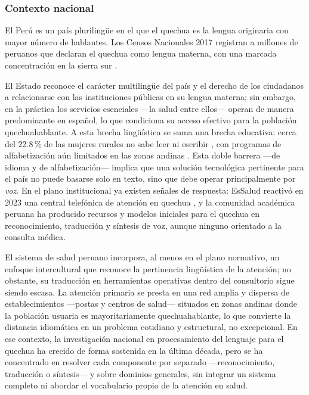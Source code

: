 \documentclass[12pt,a4paper]{article}
\newcommand{\obsdos}[1]{\textcolor{verdeOK}{#1}}
\newenvironment{bloqueObsDos}{\par\color{verdeOK}}{\par}
\begin{document}
\subsubsection{\obsdos{Contexto nacional}}
El Per{\'u} es un pa{\'i}s plurilingüe en el que el quechua es la lengua originaria con mayor
n{\'u}mero de hablantes. Los Censos Nacionales 2017 registran a millones de peruanos que declaran
el quechua como lengua materna, con una marcada concentraci{\'o}n en la sierra sur
\parencite{inei2017}.
\begin{bloqueObsDos}
\noindent El Estado reconoce el car{\'a}cter multiling{\"u}e del pa{\'i}s y el derecho de los
ciudadanos a relacionarse con las instituciones p{\'u}blicas en su lengua materna; sin embargo, en
la pr{\'a}ctica los servicios esenciales ---la salud entre ellos--- operan de manera predominante en
espa{\~n}ol, lo que condiciona su acceso efectivo para la poblaci{\'o}n quechuahablante. A esta
brecha ling{\"u}{\'i}stica se suma una brecha educativa: cerca del 22.8\,\% de las mujeres rurales no
sabe leer ni escribir \parencite{inei2023}, con programas de alfabetizaci{\'o}n a{\'u}n limitados en
las zonas andinas \parencite{dispurse2023}. Esta doble barrera ---de idioma y de
alfabetizaci{\'o}n--- implica que una soluci{\'o}n tecnol{\'o}gica pertinente para el pa{\'i}s no
puede basarse solo en texto, sino que debe operar principalmente por \emph{voz}. En el plano
institucional ya existen se{\~n}ales de respuesta: EsSalud reactiv{\'o} en 2023 una central
telef{\'o}nica de atenci{\'o}n en quechua \parencite{essalud2023}, y la comunidad acad{\'e}mica
peruana ha producido recursos y modelos iniciales para el quechua en reconocimiento, traducci{\'o}n
y s{\'i}ntesis de voz, aunque ninguno orientado a la consulta m{\'e}dica.

\noindent El sistema de salud peruano incorpora, al menos en el plano normativo, un enfoque
intercultural que reconoce la pertinencia ling{\"u}{\'i}stica de la atenci{\'o}n; no obstante, su
traducci{\'o}n en herramientas operativas dentro del consultorio sigue siendo escasa. La atenci{\'o}n
primaria se presta en una red amplia y dispersa de establecimientos ---postas y centros de salud---
situados en zonas andinas donde la poblaci{\'o}n usuaria es mayoritariamente quechuahablante, lo que
convierte la distancia idiom{\'a}tica en un problema cotidiano y estructural, no excepcional. En ese
contexto, la investigaci{\'o}n nacional en procesamiento del lenguaje para el quechua ha crecido de
forma sostenida en la {\'u}ltima d{\'e}cada, pero se ha concentrado en resolver cada componente por
separado ---reconocimiento, traducci{\'o}n o s{\'i}ntesis--- y sobre dominios generales, sin integrar
un sistema completo ni abordar el vocabulario propio de la atenci{\'o}n en salud.
\end{bloqueObsDos}
\end{document}
